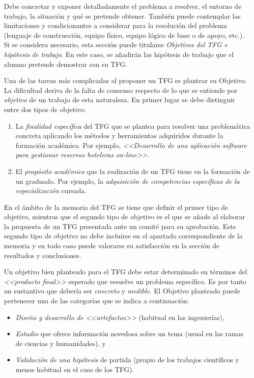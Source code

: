 Debe concretar y exponer detalladamente el problema a resolver, el entorno de trabajo, la situación y qué se pretende obtener. También puede contemplar las limitaciones y condicionantes a considerar para la resolución del problema (lenguaje de construcción, equipo físico, equipo lógico de base o de apoyo, etc.). Si se considera necesario, esta sección puede titularse \emph{Objetivos del TFG e hipótesis de trabajo}. En este caso, se añadirán las hipótesis de trabajo que el alumno pretende demostrar con su TFG.

Una de las tareas más complicadas al proponer un TFG es plantear su \textsf{Objetivo}. La dificultad deriva de la falta de consenso respecto de lo que se entiende por \emph{objetivo} de un trabajo de esta naturaleza. En primer lugar se debe distinguir entre dos tipos de objetivo:

\begin{enumerate}
	\item La \emph{finalidad específica} del TFG que se plantea para resolver una problemática concreta aplicando los métodos y herramientas adquiridos durante la formación académica. Por ejemplo, \emph{<<Desarrollo de una aplicación software para gestionar reservas hoteleras \emph{on-line}>>}.

	\item El \emph{propósito académico} que la realización de un TFG tiene en la formación de un graduado. Por ejemplo, la \emph{adquisición de competencias específicas de la especialización} cursada.
\end{enumerate}

En el ámbito de la memoria del TFG se tiene que definir el primer tipo de objetivo, mientras que el segundo tipo de objetivo es el que se añade al elaborar la propuesta de un TFG presentada ante un comité para su aprobación. Este segundo tipo de objetivo no debe incluirse en el apartado correspondiente de la memoria y en todo caso puede valorarse su satisfacción en la sección de resultados y conclusiones.

Un objetivo bien planteado para el TFG debe estar determinado en términos del \emph{<<producto final>>} esperado que resuelve un problema específico. Es por tanto un sustantivo que debería ser \emph{concreto} y \emph{medible}. El \textsf{Objetivo} planteado puede pertenecer una de las categorías que se indica a continuación:
\begin{itemize}
	\item \emph{Diseño y desarrollo de <<artefactos>>} (habitual en las ingenierías),
	\item \emph{Estudio} que ofrece información novedosa sobre un tema (usual en las ramas de ciencias y humanidades), y
	\item \emph{Validación de una hipótesis} de partida (propio de los trabajos científicos y menos habitual en el caso de los TFG).
\end{itemize}

